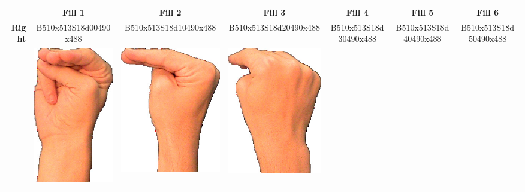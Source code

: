 \documentclass{article}
\begin{document}
\begin{center}
\begin{tabular}{r*{6}{c}}
&\textbf{Fill 1}&\textbf{Fill 2}&\textbf{Fill 3}&\textbf{Fill 4}&\textbf{Fill 5}&\textbf{Fill 6}\\
\multirow{2}{*}{\textbf{Right}}&
B510x513S18d00490x488&
B510x513S18d10490x488&
B510x513S18d20490x488&
B510x513S18d30490x488&
B510x513S18d40490x488&
B510x513S18d50490x488\\
&
\includegraphics[scale=0.1]{images/06-05-1.jpg}&
\includegraphics[scale=0.1]{images/06-05-2.jpg}&
\includegraphics[scale=0.1]{images/06-05-3.jpg}&

\end{tabular}
\end{center}
\end{document}
